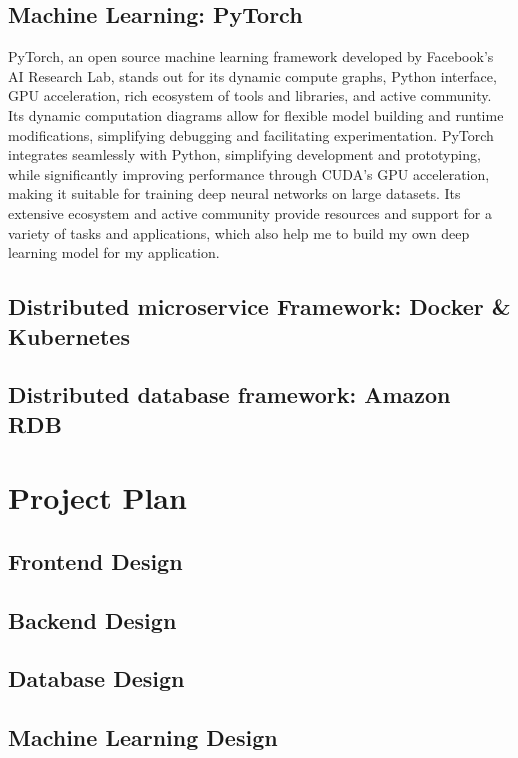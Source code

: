 \documentclass[12pt,two side]{report}
\begin{document}
\section{Machine Learning: PyTorch}
PyTorch, an open source machine learning framework developed by Facebook's AI Research Lab, stands out for its dynamic compute graphs, Python interface, GPU acceleration, rich ecosystem of tools and libraries, and active community. Its dynamic computation diagrams allow for flexible model building and runtime modifications, simplifying debugging and facilitating experimentation. PyTorch integrates seamlessly with Python, simplifying development and prototyping, while significantly improving performance through CUDA's GPU acceleration, making it suitable for training deep neural networks on large datasets. Its extensive ecosystem and active community provide resources and support for a variety of tasks and applications, which also help me to build my own deep learning model for my application.

\section{Distributed microservice Framework: Docker \& Kubernetes}
\section{Distributed database framework: Amazon RDB}

\chapter{Project Plan}
\section{Frontend Design}
\section{Backend Design}
\section{Database Design}
\section{Machine Learning Design}




\end{document}
